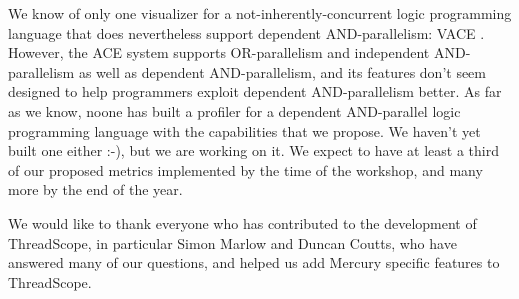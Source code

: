We know of only one visualizer
for a not-inherently-concurrent logic programming language
that does nevertheless support dependent AND-parallelism: VACE \cite{vace}.
However, the ACE system supports
OR-parallelism and independent AND-parallelism
as well as dependent AND-parallelism,
and its features don't seem designed
to help programmers exploit dependent AND-parallelism better.
As far as we know, noone has built a profiler
for a dependent AND-parallel logic programming language
with the capabilities that we propose.
We haven't yet built one either :-),
but we are working on it.
We expect to have at least a third of our proposed metrics implemented
by the time of the workshop,
and many more by the end of the year.


We would like to thank everyone
who has contributed to the development of ThreadScope,
in particular Simon Marlow and Duncan Coutts,
who have answered many of our questions,
and helped us add Mercury specific features to ThreadScope.



